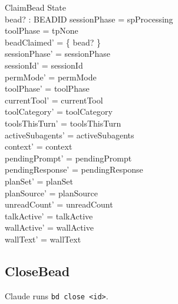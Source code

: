 \documentclass[a4paper,10pt,fleqn]{article}
\begin{document}
\begin{schema}{ClaimBead}
  \Delta State \\
  bead? : BEADID
  \where
  sessionPhase = spProcessing \\
  toolPhase = tpNone \\
  beadClaimed' = \{ bead? \} \\
  sessionPhase' = sessionPhase \\
  sessionId' = sessionId \\
  permMode' = permMode \\
  toolPhase' = toolPhase \\
  currentTool' = currentTool \\
  toolCategory' = toolCategory \\
  toolsThisTurn' = toolsThisTurn \\
  activeSubagents' = activeSubagents \\
  context' = context \\
  pendingPrompt' = pendingPrompt \\
  pendingResponse' = pendingResponse \\
  planSet' = planSet \\
  planSource' = planSource \\
  unreadCount' = unreadCount \\
  talkActive' = talkActive \\
  wallActive' = wallActive \\
  wallText' = wallText
\end{schema}

\subsection{CloseBead}

Claude runs \texttt{bd close <id>}.
\end{document}
